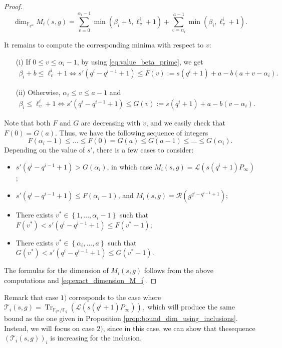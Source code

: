 \documentclass[a4paper]{article}
\theoremstyle{definition}
\theoremstyle{remark}
\newcommand{\calL}{\mathcal{L}}
\newcommand{\calR}{\mathcal{R}}
\newcommand{\calT}{\mathcal{T}}
\newcommand{\fqm}{\mathbb{F}_{q^m}}
\newcommand{\fq}{\mathbb{F}_{q}}
\newcommand{\Tr}[1]{\operatorname{Tr}_{\mathbb{F}_{q^m}/\fq}\left(#1\right)}
\newcommand{\set}[1]{\left\{#1\right\}}
\begin{document}
\begin{proof}
\begin{equation} \label{eq:exact_dimension_M_i}
\dim_{\fqm} M_i(s,g) = \sum\limits_{v=0}^{\alpha_i-1} \min(\beta_i+b,\ell_v^i+1) + \sum\limits_{v=\alpha_i}^{a-1} \min(\beta_i,\ell_v^i+1).
\end{equation}

It remains to compute the corresponding minima with respect to $v$:
\begin{itemize}
    \item[(i)] If $0 \leq v \leq \alpha_i-1$, by using \eqref{eq:value_beta_prime}, we get
    \begin{align*}
        \beta_i+b \leq \ell_v^i +1 \iff s'(q^i-q^{i-1}+1) \leq F(v) := s(q^i+1)+a-b(a+v-\alpha_i).
    \end{align*}
    \item[(ii)] Otherwise, $\alpha_i \leq v \leq a-1$ and
    \begin{align*}
        \beta_i \leq \ell_v^i +1 \iff s'(q^i-q^{i-1}+1) \leq G(v) := s(q^i+1)+a-b(v-\alpha_i).
    \end{align*}
\end{itemize}
Note that both $F$ and $G$ are decreasing with $v$, and we easily check that $F(0) = G(a)$. Thus, we have the following sequence of integers
$$F(\alpha_i-1) \leq \dots \leq F(0) = G(a) \leq G(a-1) \leq \dots \leq G(\alpha_i).$$
Depending on the value of $s'$, there is a few cases  to consider:
\begin{itemize}
    \item $s'(q^i-q^{i-1}+1) >G(\alpha_i)$, in which case $M_i(s,g) = \calL(s(q^i+1)P_\infty)$;
    \item $s'(q^i-q^{i-1}+1) \leq F(\alpha_i-1)$, and $M_i(s,g) = \calR(g^{q^i-q^{i-1}+1})$;
    \item There exists $v^* \in \set{1,...,\alpha_i-1}$ such that $F(v^*) < s'(q^i-q^{i-1}+1) \leq F(v^*-1)$;
    \item There exists $v^* \in \set{\alpha_i,...,a}$ such that $G(v^*) < s'(q^i-q^{i-1}+1) \leq G(v^*-1)$.

\end{itemize}
The formulas for the dimension of $M_i(s,g)$ follows from the above computations and \eqref{eq:exact_dimension_M_i}.
\end{proof}

Remark that case $\textit{1)}$ corresponds to the case where $\calT_i(s,g) = \Tr{\calL(s(q^i+1)P_\infty)}, $ which will produce the same bound as the one given in Proposition \ref{prop:bound_dim_using_inclusions}.
Instead, we will focus on case $2)$, since in this case, we can show that thesequence $(\calT_i(s,g))_i$ is increasing for the inclusion.
\end{document}
